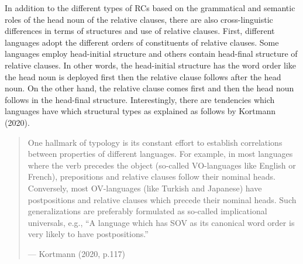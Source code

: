 \documentclass[
]{article}
\begin{document}
In addition to the different types of RCs based on the grammatical and
semantic roles of the head noun of the relative clauses, there are also
cross-linguistic differences in terms of structures and use of relative
clauses. First, different languages adopt the different orders of
constituents of relative clauses. Some languages employ head-initial
structure and others contain head-final structure of relative clauses.
In other words, the head-initial structure has the word order like the
head noun is deployed first then the relative clause follows after the
head noun. On the other hand, the relative clause comes first and then
the head noun follows in the head-final structure. Interestingly, there
are tendencies which languages have which structural types as explained
as follows by Kortmann (2020).

\vspace{1em}

\begin{quote}
One hallmark of typology is its constant effort to establish
correlations between properties of different languages. For example, in
most languages where the verb precedes the object (so-called
VO-languages like English or French), prepositions and relative clauses
follow their nominal heads. Conversely, most OV-languages (like Turkish
and Japanese) have postpositions and relative clauses which precede
their nominal heads. Such generalizations are preferably formulated as
so-called implicational universals, e.g., ``A language which has SOV as
its canonical word order is very likely to have postpositions.''

--- Kortmann (2020, p.117)
\end{quote}

\vspace{1em}
\end{document}
